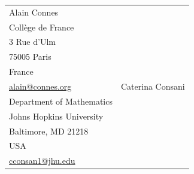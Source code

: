 \documentclass[11pt,a4paper]{article}
\theoremstyle{plain}
\theoremstyle{definition} %
\begin{document}
\vspace{5pt}
\small
\noindent

\begin{tabular}{p{} p{}}
\raggedright
Alain Connes\\
Coll\`ege de France\\
3 Rue d'Ulm\\
75005 Paris\\
France\\
\href{mailto:alain@connes.org}{alain@connes.org}
&
\raggedleft
Caterina Consani\\
Department of Mathematics\\
Johns Hopkins University\\
Baltimore, MD 21218\\
USA\\
\href{mailto:cconsan1@jhu.edu}{cconsan1@jhu.edu}
\end{tabular}
\end{document}

